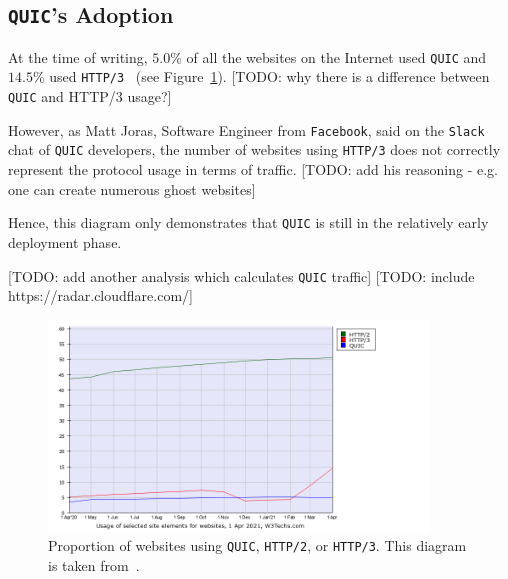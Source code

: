 \documentclass[12pt,a4paper,twoside,openright]{report}
\begin{document}
\subsection{\texttt{QUIC}'s Adoption}

At the time of writing, $5.0\%$ of all the websites on the Internet used \texttt{QUIC} and $14.5\%$ used \texttt{HTTP/3}~\cite{bib_Adoption_comparison_Between_http2_http3_quic}
(see Figure~\ref{fig:Adoption_comparison_Between_http2_http3_quic}).
[TODO: why there is a difference between \texttt{QUIC} and HTTP/3 usage?]


However, as Matt Joras, Software Engineer from \texttt{Facebook}, said on the \texttt{Slack} chat of \texttt{QUIC} developers, the number of websites using \texttt{HTTP/3} does not correctly represent the protocol usage in terms of traffic. 
[TODO: add his reasoning - e.g. one can create numerous ghost websites]

Hence, this diagram only demonstrates that \texttt{QUIC} is still in the relatively early deployment phase.

[TODO: add another analysis which calculates \texttt{QUIC} traffic]
[TODO: include https://radar.cloudflare.com/]


    \begin{figure}[ht]
    \centering
    \includegraphics[width=0.9\textwidth]{figs/Adoption_comparison_Between_http2_http3_quic.png}
    \caption[Proportion of websites using \texttt{QUIC}, \texttt{HTTP/2}, or \texttt{HTTP/3}]{Proportion of websites using \texttt{QUIC}, \texttt{HTTP/2}, or \texttt{HTTP/3}. This diagram is taken from~\cite{bib_Adoption_comparison_Between_http2_http3_quic}.}
    \label{fig:Adoption_comparison_Between_http2_http3_quic}
    \end{figure}
\end{document}
